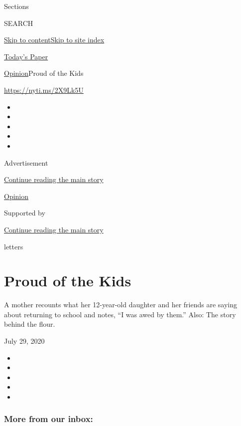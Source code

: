Sections

SEARCH

\protect\hyperlink{site-content}{Skip to
content}\protect\hyperlink{site-index}{Skip to site index}

\href{https://myaccount.nytimes3xbfgragh.onion/auth/login?response_type=cookie\&client_id=vi}{}

\href{https://www.nytimes3xbfgragh.onion/section/todayspaper}{Today's
Paper}

\href{/section/opinion}{Opinion}\textbar{}Proud of the Kids

\url{https://nyti.ms/2X9Lk5U}

\begin{itemize}
\item
\item
\item
\item
\item
\end{itemize}

Advertisement

\protect\hyperlink{after-top}{Continue reading the main story}

\href{/section/opinion}{Opinion}

Supported by

\protect\hyperlink{after-sponsor}{Continue reading the main story}

letters

\hypertarget{proud-of-the-kids}{%
\section{Proud of the Kids}\label{proud-of-the-kids}}

A mother recounts what her 12-year-old daughter and her friends are
saying about returning to school and notes, ``I was awed by them.''
Also: The story behind the flour.

July 29, 2020

\begin{itemize}
\item
\item
\item
\item
\item
\end{itemize}

\hypertarget{more-from-our-inbox}{%
\subsubsection{More from our inbox:}\label{more-from-our-inbox}}

